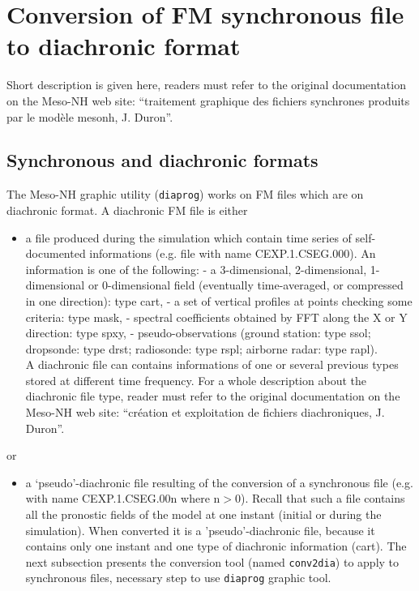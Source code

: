 \section{Conversion of FM synchronous file to diachronic format}
Short description is given here, readers must refer to the original documentation on the Meso-NH web site:
``{\sc traitement graphique des fichiers synchrones produits par le mod\`ele
mesonh}, J. Duron''. 

\subsection{Synchronous and diachronic formats} \label{diachro_file}
The Meso-NH graphic utility ({\tt diaprog}) works on FM files which are on
diachronic format. A diachronic FM file is either
\begin{itemize}
\item
a file produced during the simulation 
which contain time series of self-documented informations
(e.g. file with name CEXP.1.CSEG.000).
An information is one of the following: 
\subitem - a
3-dimensional, 2-dimensional, 1-dimensional or 0-dimensional field (eventually
time-averaged, or compressed in one direction): type {\sc cart}, 
\subitem - a set of vertical profiles at points checking some criteria:
type {\sc mask}, 
\subitem - spectral coefficients obtained by FFT along the X or Y direction:
type {\sc spxy},
\subitem - pseudo-observations (ground station: type {\sc ssol};
dropsonde: type {\sc drst}; radiosonde: type {\sc rspl};
airborne radar: type {\sc rapl}).
 \\
A diachronic file can contains informations of one or several previous types
stored at different time frequency.
For a whole description about the diachronic file type, reader must refer
to the original documentation on the Meso-NH web site:
``{\sc cr\'eation et exploitation de fichiers diachroniques}, J. Duron''. 
\end{itemize}
or
\begin{itemize}
\item a `pseudo'-diachronic file resulting of the conversion of a synchronous
file (e.g. with name CEXP.1.CSEG.00n where n$>$0).
Recall that such a file contains all the pronostic fields of the model at one 
instant (initial or during the simulation).
When converted it is a 'pseudo'-diachronic file, because it contains only one 
instant and one type of diachronic information ({\sc cart}).
The next subsection presents the conversion tool (named \texttt{conv2dia})
to apply to synchronous files, necessary step to use \texttt{diaprog} graphic
tool.
\end{itemize}

